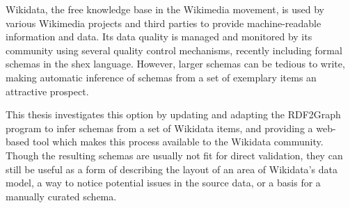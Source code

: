 
\Abstract
\Gls{Wikidata}, the free knowledge base in the \gls{Wikimedia} movement,
is used by various \gls{Wikimedia} projects and third parties to provide machine-readable information and data.
Its data quality is managed and monitored by its community using several quality control mechanisms,
recently including formal \glspl{schema} in the \acrlong{shex} language.
However, larger \glspl{schema} can be tedious to write,
making automatic inference of \glspl{schema} from a set of exemplary \glspl{item}
an attractive prospect.

This thesis investigates this option
by updating and adapting the \gls{RDF2Graph} program
to infer \glspl{schema} from a set of \gls{Wikidata} \glspl{item},
and providing a web-based tool which makes this process available to the \gls{Wikidata} community.
Though the resulting \glspl{schema} are usually not fit for direct validation,
they can still be useful as a form of describing the layout of an area of \gls{Wikidata}’s data model,
a way to notice potential issues in the source data,
or a basis for a manually curated \gls{schema}.
